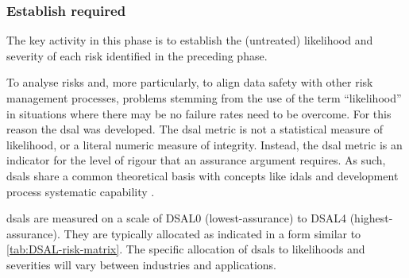 \subsubsection{Establish required }
\label{bkm:DSAL-table-section}
The key activity in this phase is to establish the (untreated) likelihood and severity of each risk identified in the preceding phase.

To analyse risks and, more particularly, to align data safety with other risk management processes, problems stemming from the use of the term ``likelihood'' in situations where there may be no failure rates need to be overcome. For this reason the \gls{dsal} was developed. The \gls{dsal} metric is not a statistical measure of likelihood, or a literal numeric measure of \gls{integrity}. Instead, the \gls{dsal} metric is an indicator for the level of rigour that an assurance argument requires. As such, \glspl{dsal} share a common theoretical basis with concepts like \glspl{idal}  \cite{citation:arp4754a2010guidelines} and development process systematic capability \cite{citation:iec615083}.

\glspl{dsal} are measured on a scale of DSAL0 (lowest-assurance) to DSAL4 (highest-assurance). They are typically allocated as indicated in a form similar to  \autoref{tab:DSAL-risk-matrix}. The specific allocation of \glspl{dsal} to likelihoods and severities will vary between industries and applications.

